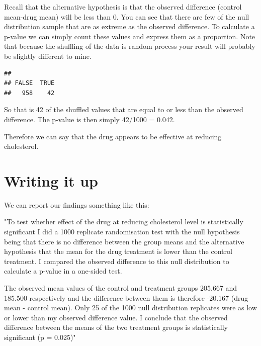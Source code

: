 \documentclass[
  a4paperpaper,
]{book}
\newenvironment{Shaded}{\begin{snugshade}}{\end{snugshade}}
\newcommand{\KeywordTok}[1]{\textcolor[rgb]{0.13,0.29,0.53}{\textbf{#1}}}
\newcommand{\NormalTok}[1]{#1}
\newcommand{\OperatorTok}[1]{\textcolor[rgb]{0.81,0.36,0.00}{\textbf{#1}}}
\begin{document}
Recall that the alternative hypothesis is that the observed difference (control mean-drug mean) will be less than 0.
You can see that there are few of the null distribution sample that are as extreme as the observed difference. To calculate a p-value we can simply count these values and express them as a proportion. Note that because the shuffling of the data is random process your result will probably be slightly different to mine.

\begin{Shaded}
\end{Shaded}

\begin{verbatim}
## 
## FALSE  TRUE 
##   958    42
\end{verbatim}

So that is 42 of the shuffled values that are equal to or less than the observed difference. The p-value is then simply 42/1000 = 0.042.

Therefore we can say that the drug appears to be effective at reducing cholesterol.

\hypertarget{writing-it-up}{%
\section{Writing it up}\label{writing-it-up}}

We can report our findings something like this:

"To test whether effect of the drug at reducing cholesterol level is statistically significant I did a 1000 replicate randomisation test with the null hypothesis being that there is no difference between the group means and the alternative hypothesis that the mean for the drug treatment is lower than the control treatment. I compared the observed difference to this null distribution to calculate a p-value in a one-sided test.

The observed mean values of the control and treatment groups 205.667 and 185.500 respectively and the difference between them is therefore -20.167 (drug mean - control mean). Only 25 of the 1000 null distribution replicates were as low or lower than my observed difference value. I conclude that the observed difference between the means of the two treatment groups is statistically significant (p = 0.025)"
\end{document}
